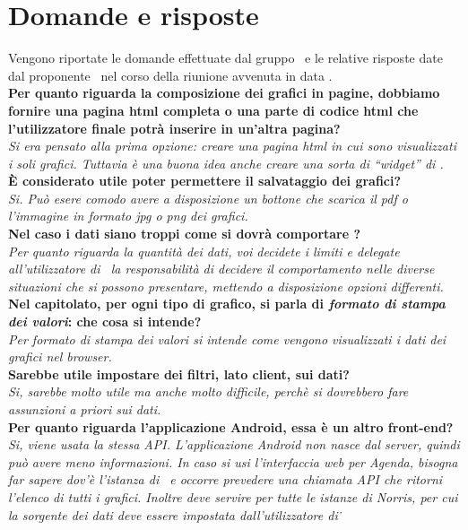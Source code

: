\section{Domande e risposte}
	Vengono riportate le domande effettuate dal gruppo \groupname\ e le relative risposte date dal proponente \proponente\, nel corso della riunione avvenuta in data .\\

	\textbf{Per quanto riguarda la composizione dei grafici in pagine, dobbiamo fornire una pagina html completa o una parte di codice html che l'utilizzatore finale potrà inserire in un'altra pagina?}\\
	\textit{Si era pensato alla prima opzione: creare una pagina html in cui sono visualizzati i soli grafici. Tuttavia è una buona idea anche creare una sorta di ``widget'' di \projectname.}\\
	
	\textbf{\`{E} considerato utile poter permettere il salvataggio dei grafici?}\\
	\textit{Si. Può esere comodo avere a disposizione un bottone che scarica il pdf o l'immagine in formato jpg o png dei grafici.}\\

	\textbf{Nel caso i dati siano troppi come si dovrà comportare \projectname?}\\
	\textit{Per quanto riguarda la quantità dei dati, voi decidete i limiti e delegate all'utilizzatore di \projectname\ la responsabilità di decidere il comportamento nelle diverse situazioni che si possono presentare, mettendo a disposizione opzioni differenti.}\\
	
	\textbf{Nel capitolato, per ogni tipo di grafico, si parla di \textit{formato di stampa dei valori}: che cosa si intende?}\\
	\textit{Per \textit{formato di stampa dei valori} si intende come vengono visualizzati i dati dei grafici nel browser.}\\
	
	\textbf{Sarebbe utile impostare dei filtri, lato client, sui dati?}\\
	\textit{Si, sarebbe molto utile ma anche molto difficile, perchè si dovrebbero fare assunzioni a priori sui dati.}\\
	
	\textbf{Per quanto riguarda l'applicazione Android, essa è un altro front-end?}\\
	\textit{Si, viene usata la stessa API. L'applicazione Android non nasce dal server, quindi può avere meno informazioni. In caso si usi l'interfaccia web per Agenda, bisogna far sapere dov'è l'istanza di \projectname\ e occorre prevedere una chiamata API che ritorni l'elenco di tutti i grafici. Inoltre deve servire per tutte le istanze di Norris, per cui la sorgente dei dati deve essere impostata dall'utilizzatore di \projectname\.}\\

	